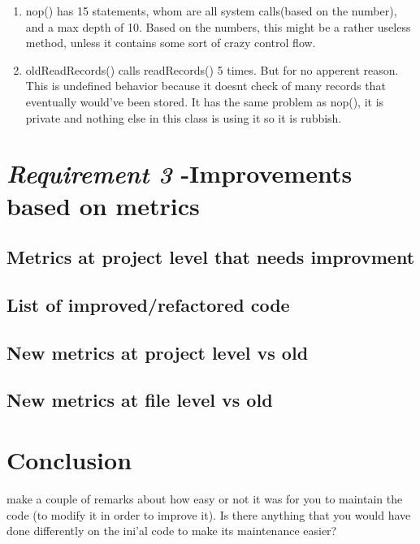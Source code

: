 \documentclass{article}
\begin{document}
\begin{enumerate}
\begin{enumerate}
\item
nop() has 15 statements, whom are all system calls(based on the number), and a max depth
of 10. Based on the numbers, this might be a rather useless method, unless it contains
some sort of crazy control flow.

\item
oldReadRecords() calls readRecords() 5 times. But for no apperent reason.
This is undefined behavior because it doesnt check of many records that eventually
would've been stored. It has the same problem as nop(), it is private and nothing else in this class is using it so it is rubbish.


\end{enumerate}


\end{enumerate}
\section{\textit{Requirement 3} -Improvements based on metrics}

\subsection{Metrics at project level that needs improvment}

\subsection{List of improved/refactored code}

\subsection{New metrics at project level vs old}

\subsection{New metrics at file level vs old}

\section{Conclusion}
make a couple of remarks about how easy or not it was for you to maintain the code
(to modify it in order to improve it). Is there anything that you would have done differently on
the ini'al code to make its maintenance easier?
\end{document}
